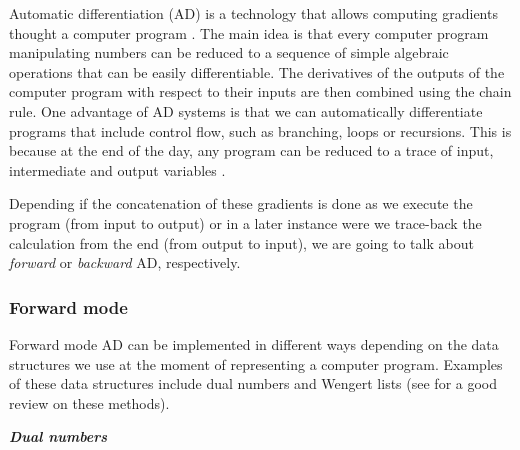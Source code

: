 Automatic differentiation (AD) is a technology that allows computing gradients thought a computer program \cite{griewank2008evaluatingderivatives}. 
The main idea is that every computer program manipulating numbers can be reduced to a sequence of simple algebraic operations that can be easily differentiable. 
The derivatives of the outputs of the computer program with respect to their inputs are then combined using the chain rule.
One advantage of AD systems is that we can automatically differentiate programs that include control flow, such as branching, loops or recursions. 
This is because at the end of the day, any program can be reduced to a trace of input, intermediate and output variables \cite{Baydin_Pearlmutter_Radul_Siskind_2015}.

Depending if the concatenation of these gradients is done as we execute the program (from input to output) or in a later instance were we trace-back the calculation from the end (from output to input), we are going to talk about \textit{forward} or \textit{backward} AD, respectively.

\subsubsection{Forward mode}

Forward mode AD can be implemented in different ways depending on the data structures we use at the moment of representing a computer program. Examples of these data structures include dual numbers and Wengert lists (see \cite{Baydin_Pearlmutter_Radul_Siskind_2015} for a good review on these methods). 

\vspace*{10px}
\noindent \textbf{\textit{Dual numbers}}
\vspace*{5px}

